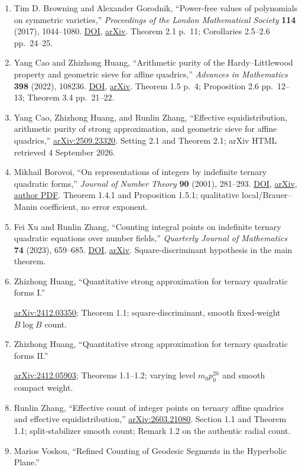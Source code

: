\begin{enumerate}
\item
  Tim D. Browning and Alexander Gorodnik, ``Power-free values of polynomials on symmetric varieties,'' \emph{Proceedings of the London Mathematical Society} \textbf{114} (2017), 1044--1080. \href{https://doi.org/10.1112/plms.12030}{DOI}, \href{https://arxiv.org/abs/1606.06342}{arXiv}. Theorem 2.1 p.~11; Corollaries 2.5--2.6 pp.~24--25.
\item
  Yang Cao and Zhizhong Huang, ``Arithmetic purity of the Hardy--Littlewood property and geometric sieve for affine quadrics,'' \emph{Advances in Mathematics} \textbf{398} (2022), 108236. \href{https://doi.org/10.1016/j.aim.2022.108236}{DOI}, \href{https://arxiv.org/abs/2003.07287}{arXiv}. Theorem 1.5 p.~4; Proposition 2.6 pp.~12--13; Theorem 3.4 pp.~21--22.
\item
  Yang Cao, Zhizhong Huang, and Runlin Zhang, ``Effective equidistribution, arithmetic purity of strong approximation, and geometric sieve for affine quadrics,'' \href{https://arxiv.org/abs/2509.23320}{arXiv:2509.23320}. Setting 2.1 and Theorem 2.1; arXiv HTML retrieved 4 September 2026.
\item
  Mikhail Borovoi, ``On representations of integers by indefinite ternary quadratic forms,'' \emph{Journal of Number Theory} \textbf{90} (2001), 281--293. \href{https://doi.org/10.1006/jnth.2001.2662}{DOI}, \href{https://arxiv.org/abs/math/0006141}{arXiv}, \href{https://www.math.tau.ac.il/~borovoi/papers/reprfin.pdf}{author PDF}. Theorem 1.4.1 and Proposition 1.5.1; qualitative local/Brauer--Manin coefficient, no error exponent.
\item
  Fei Xu and Runlin Zhang, ``Counting integral points on indefinite ternary quadratic equations over number fields,'' \emph{Quarterly Journal of Mathematics} \textbf{74} (2023), 659--685. \href{https://doi.org/10.1093/qmath/haac039}{DOI}, \href{https://arxiv.org/abs/2103.10707}{arXiv}. Square-discriminant hypothesis in the main theorem.
\item
  Zhizhong Huang, ``Quantitative strong approximation for ternary quadratic
  forms I.''

  \href{https://arxiv.org/abs/2412.03350}{arXiv:2412.03350}; Theorem 1.1;
  square-discriminant, smooth fixed-weight \(B\log B\) count.
\item
  Zhizhong Huang, ``Quantitative strong approximation for ternary quadratic
  forms II.''

  \href{https://arxiv.org/abs/2412.05903}{arXiv:2412.05903}; Theorems 1.1--1.2;
  varying level \(m_0p_0^{2h}\) and smooth compact weight.
\item
  Runlin Zhang, ``Effective count of integer points on ternary affine quadrics and effective equidistribution,'' \href{https://arxiv.org/abs/2603.21080}{arXiv:2603.21080}. Section 1.1 and Theorem 1.1; split-stabilizer smooth count; Remark 1.2 on the authentic radial count.
\item
  Marios Voskou, ``Refined Counting of Geodesic Segments in the Hyperbolic
  Plane.''


\end{enumerate}
